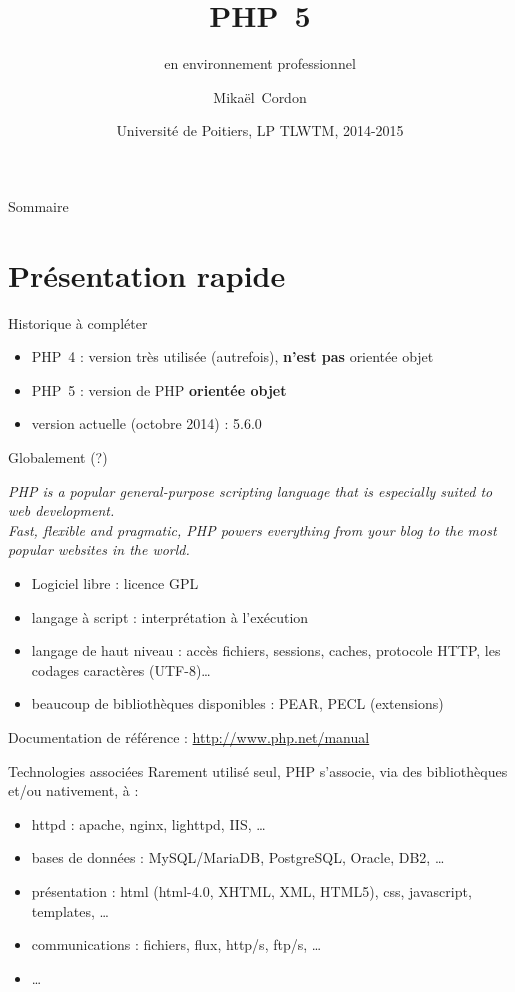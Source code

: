 \documentclass{beamer}
\title{PHP~5}
\subtitle{en environnement professionnel}
\author{Mikaël~Cordon}
\date{Université de Poitiers, LP TLWTM, 2014-2015}
\begin{document}
\begin{frame}
  \titlepage
\end{frame}

\begin{frame}{Sommaire}
  \tableofcontents[subsectionstyle=hide,subsubsectionstyle=hide]
\end{frame}

\section{Présentation rapide}

\begin{frame}{Historique}
à compléter
    \begin{itemize}
    \item PHP~4 : version très utilisée (autrefois), \textbf{n’est pas} orientée objet
    \item PHP~5 : version de PHP \textbf{orientée objet}
    \item version actuelle (octobre 2014) : 5.6.0
    \end{itemize}

\end{frame}

\begin{frame}{Globalement (?)}
    \begin{block}{}
        \textit{PHP is a popular general-purpose scripting language that is especially suited to web development.\\
        Fast, flexible and pragmatic, PHP powers everything from your blog to the most popular websites in the world.}
    \end{block}
    \begin{itemize}
        \item Logiciel libre : licence GPL
        \item langage à script : interprétation à l’exécution
        \item langage de haut niveau : accès fichiers, sessions, caches, protocole HTTP, les codages caractères (UTF-8)\ldots
        \item beaucoup de bibliothèques disponibles : PEAR, PECL (extensions)
    \end{itemize}
    Documentation de référence : \url{http://www.php.net/manual}

\end{frame}

\begin{frame}{Technologies associées}
Rarement utilisé seul, PHP s’associe, via des bibliothèques et/ou nativement, à :
\begin{itemize}
\item httpd : apache, nginx, lighttpd, IIS, \ldots
\item bases de données : MySQL/MariaDB, PostgreSQL, Oracle, DB2, \ldots
\item présentation : html (html-4.0, XHTML, XML, HTML5), css, javascript, templates, \ldots
\item communications : fichiers, flux, http/s, ftp/s, \ldots
\item \ldots
\end{itemize}

\end{frame}
\end{document}
